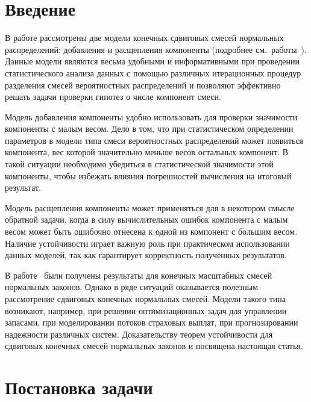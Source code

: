       \begin{multicols}{2}

            \label{st\stat}
     


\newcommand*{\E}{\mathbb E}

\section{Введение}

В работе рассмотрены две модели конечных сдвиговых смесей
нормальных распределений: добавления и расщепления компоненты
(подробнее см.\ работы~\cite{Gorshenin2011, Gorshenin2011Mod2}).
Данные модели являются весьма удобными и информативными при
проведении статистического анализа данных с помощью различных
итерационных процедур разделения смесей вероятностных
распределений и позволяют эффективно решать задачи проверки гипотез о числе компонент смеси.

Модель добавления компоненты удобно использовать для проверки
значимости компоненты с малым весом.  Дело в том, что при
статистическом определении параметров в модели типа
смеси вероятностных распределений может появиться ком\-по\-нен\-та, вес
которой значительно меньше весов остальных компонент. В такой
ситуации необходимо убедиться в статистической значимости этой
компоненты, чтобы избежать влияния погрешностей вычисления на
итоговый результат.

Модель расщепления компоненты может применяться для в некотором
смысле обратной задачи, когда в силу вычислительных ошибок
компонента с малым весом может быть ошибочно отнесена к одной из
компонент с б$\acute{\mbox{о}}$льшим весом. Наличие устойчивости играет важную
роль при практическом использовании данных моделей, так как
гарантирует корректность полученных результатов.

В работе~\cite{Gorshenin2012SSI} были получены результаты для
конечных масштабных смесей нормальных законов. Однако в ряде
ситуаций оказывается полезным рассмотрение сдвиговых конечных
нормальных смесей. Модели такого типа возникают, например, при
решении оптимизационных задач для управлении запасами, при
моделировании потоков страховых выплат, при прогнозировании
надежности различных систем. Доказательству теорем устойчивости для
сдвиговых конечных смесей нормальных законов  и посвящена настоящая
статья.

\section{Постановка задачи}


\end{multicols}
